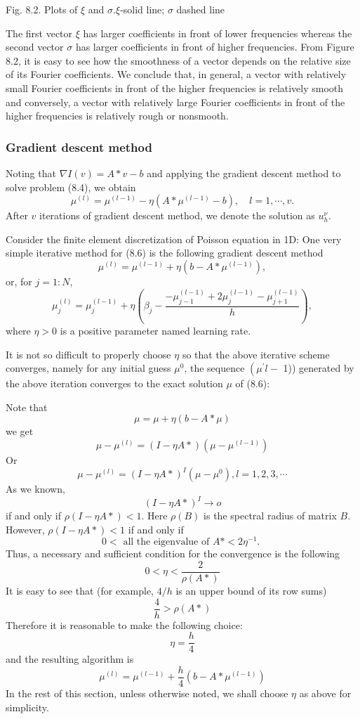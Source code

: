 \documentclass[10pt]{article}
\begin{document}
Fig. 8.2. Plots of $\xi$ and $\sigma . \xi$-solid line; $\sigma$ dashed line

The first vector $\xi$ has larger coefficients in front of lower frequencies whereas the second vector $\sigma$ has larger coefficients in front of higher frequencies. From Figure $8.2$, it is easy to see how the smoothness of a vector depends on the relative size of its Fourier coefficients. We conclude that, in general, a vector with relatively small Fourier coefficients in front of the higher frequencies is relatively smooth and conversely, a vector with relatively large Fourier coefficients in front of the higher frequencies is relatively rough or nonsmooth.

\subsubsection{Gradient descent method}
Noting that $\nabla I(v)=A * v-b$ and applying the gradient descent method to solve problem (8.4), we obtain
$$
\mu^{(l)}=\mu^{(l-1)}-\eta\left(A * \mu^{(l-1)}-b\right), \quad l=1, \cdots, v .
$$
After $v$ iterations of gradient descent method, we denote the solution as $u_{h}^{\nu}$.

Consider the finite element discretization of Poisson equation in 1D: One very simple iterative method for (8.6) is the following gradient descent method
$$
\mu^{(l)}=\mu^{(l-1)}+\eta\left(b-A * \mu^{(l-1)}\right),
$$
or, for $j=1: N$,
$$
\mu_{j}^{(l)}=\mu_{j}^{(l-1)}+\eta\left(\beta_{j}-\frac{-\mu_{j-1}^{(l-1)}+2 \mu_{j}^{(l-1)}-\mu_{j+1}^{(l-1)}}{h}\right),
$$
where $\eta>0$ is a positive parameter named learning rate.

It is not so difficult to properly choose $\eta$ so that the above iterative scheme converges, namely for any initial guess $\mu^{0}$, the sequence $\left(\mu^{\prime} l-\right.$ 1)) generated by the above iteration converges to the exact solution $\mu$ of (8.6):

Note that
$$
\mu=\mu+\eta(b-A * \mu)
$$
we get
$$
\mu-\mu^{(l)}=(I-\eta A *)\left(\mu-\mu^{(l-1)}\right)
$$
Or
$$
\mu-\mu^{(l)}=(I-\eta A *)^{I}\left(\mu-\mu^{0}\right), l=1,2,3, \cdots
$$
As we known,
$$
(I-\eta A *)^{I} \longrightarrow o
$$
if and only if $\rho(I-\eta A *)<1$. Here $\rho(B)$ is the spectral radius of matrix $B$. However, $\rho(I-\eta A *)<1$ if and only if
$$
0<\text { all the eigenvalue of } A *<2 \eta^{-1} \text {. }
$$
Thus, a necessary and sufficient condition for the convergence is the following
$$
0<\eta<\frac{2}{\rho(A *)}
$$
It is easy to see that (for example, $4 / h$ is an upper bound of its row sums)
$$
\frac{4}{h}>\rho(A *)
$$
Therefore it is reasonable to make the following choice:
$$
\eta=\frac{h}{4}
$$
and the resulting algorithm is
$$
\mu^{(l)}=\mu^{(l-1)}+\frac{h}{4}\left(b-A * \mu^{(l-1)}\right)
$$
In the rest of this section, unless otherwise noted, we shall choose $\eta$ as above for simplicity.
\end{document}
